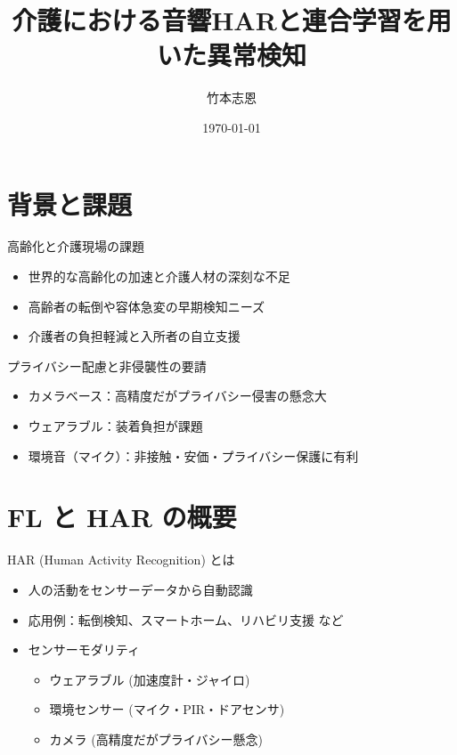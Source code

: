 \documentclass[unicode,12pt,aspectratio=169,dvipdfmx]{beamer}
\title{介護における音響HARと連合学習を用いた異常検知}
\author{竹本志恩}
\institute{INIAD}
\date{\today}
\begin{document}
\begin{frame}
  \maketitle
  \vspace{0.8cm}
  \tableofcontents
\end{frame}

\section{背景と課題}

\begin{frame}{高齢化と介護現場の課題}
  \begin{itemize}
    \item 世界的な高齢化の加速と介護人材の深刻な不足
    \item 高齢者の転倒や容体急変の早期検知ニーズ
    \item 介護者の負担軽減と入所者の自立支援
  \end{itemize}
\end{frame}

\begin{frame}{プライバシー配慮と非侵襲性の要請}
  \begin{itemize}
    \item カメラベース：高精度だがプライバシー侵害の懸念大
    \item ウェアラブル：装着負担が課題
    \item 環境音（マイク）：非接触・安価・プライバシー保護に有利
  \end{itemize}
\end{frame}

\section{FL と HAR の概要}

\begin{frame}{HAR (Human Activity Recognition) とは}
  \begin{itemize}
    \item 人の活動をセンサーデータから自動認識
    \item 応用例：転倒検知、スマートホーム、リハビリ支援 など
    \item センサーモダリティ
    \begin{itemize}
      \item ウェアラブル (加速度計・ジャイロ)
      \item 環境センサー (マイク・PIR・ドアセンサ)
      \item カメラ (高精度だがプライバシー懸念)
    \end{itemize}
  \end{itemize}
\end{frame}
\end{document}

